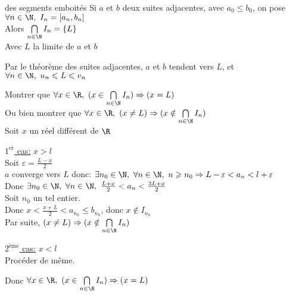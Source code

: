 \documentclass[12pt,twoside,a4paper]{article}
\begin{document}
	\begin{theo}{des segments emboit\'es}
		Si $a$ et $b$ deux suites adjacentes, avec $a_0\leqslant b_0$, on pose $\forall n\in\N,\ I_n=[a_n,b_n]$\\
		Alors $\bigcap\limits_{n\in\N}I_n=\{L\}$\\
		Avec $L$ la limite de $a$ et $b$
	\end{theo}
	\begin{preuve}
		\begin{liste}
			\item Par le th\'eor\`eme des suites adjacentes, $a$ et $b$ tendent vers $L$, et $\forall n\in\N,\ u_n\leqslant L\leqslant v_n$
			\item Montrer que $\forall x\in\R,\ (x\in\bigcap\limits_{n\in\N}I_n)\Rightarrow(x=L)$\\
				Ou bien montrer que $\forall x\in\R,\ (x\neq L)\Rightarrow(x\notin\bigcap\limits_{n\in\N}I_n)$\\
				Soit $x$ un réel différent de $\R$
				\begin{liste}
					\item \underline{$1^{\text{er}}$ cas:} $x>l$\\
						Soit $\varepsilon=\frac{L-x}{2}$\\
						$a$ converge vers $L$ donc: $\exists n_0\in\N,\ \forall n\in\N,\ n\geqslant n_0\Rightarrow L-\varepsilon<a_n<l+\varepsilon$\\
						Donc $\exists n_0\in\N,\ \forall n\in\N,\ \frac{L+x}{2}<a_n<\frac{3L+x}{2}$\\
						Soit $n_0$ un tel entier.\\
						Donc $x<\frac{x+L}{2}<a_{n_0}\leqslant b_{n_0}$, donc $x\notin I_{n_0}$\\
						Par suite, $(x\neq L)\Rightarrow(x\notin\bigcap\limits_{n\in\N}I_n)$
					\item \underline{$2^{\text{\`eme}}$ cas:} $x<l$\\
						Procéder de m\^eme.
				\end{liste}
		\end{liste}
		Donc $\forall x\in\R,\ (x\in\bigcap\limits_{n\in\N}I_n)\Rightarrow(x=L)$
	\end{preuve}
\end{document}
